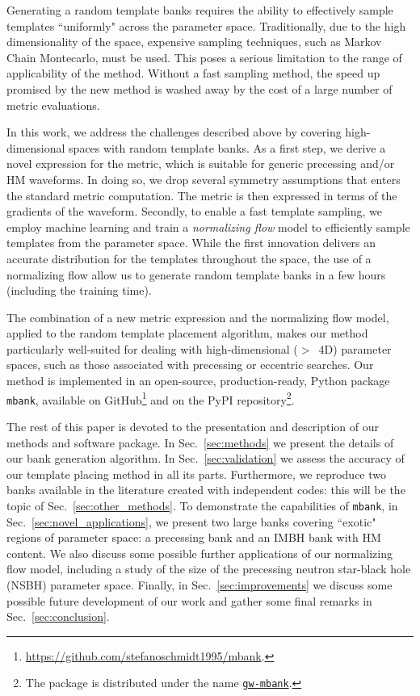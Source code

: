 \documentclass[twocolumn,showpacs,preprintnumbers,nofootinbib,prd,
superscriptaddress,10pt]{revtex4-2}
\begin{document}
Generating a random template banks requires the ability to effectively sample templates ``uniformly" across the parameter space. Traditionally, due to the high dimensionality of the space, expensive sampling techniques, such as Markov Chain Montecarlo, must be used. This poses a serious limitation to the range of applicability of the method. Without a fast sampling method, the speed up promised by the new method is washed away by the cost of a large number of metric evaluations.

In this work, we address the challenges described above by covering high-dimensional spaces with random template banks.
As a first step, we derive a novel expression for the metric, which is suitable for generic precessing and/or HM waveforms. In doing so, we drop several symmetry assumptions that enters the standard metric computation. The metric is then expressed in terms of the gradients of the waveform.
Secondly, to enable a fast template sampling, we employ machine learning and train a {\it normalizing flow} model to efficiently sample templates from the parameter space.
While the first innovation delivers an accurate distribution for the templates throughout the space, the use of a normalizing flow allow us to generate random template banks in a few hours (including the training time).

The combination of a new metric expression and the normalizing flow model, applied to the random template placement algorithm, makes our method particularly well-suited for dealing with high-dimensional ($>$~4D) parameter spaces, such as those associated with precessing or eccentric searches.
Our method is implemented in an open-source, production-ready, Python package \texttt{mbank}\cite{mbank}, available on GitHub\footnote{
\href{https://github.com/stefanoschmidt1995/mbank}{https://github.com/stefanoschmidt1995/mbank}.}
and on the PyPI repository\footnote{
The package is distributed under the name \texttt{\href{https://pypi.org/project/gw-mbank/}{gw-mbank}}.
}.

The rest of this paper is devoted to the presentation and description of our methods and software package.
In Sec.~\ref{sec:methods} we present the details of our bank generation algorithm.
In Sec.~\ref{sec:validation} we assess the accuracy of our template placing method in all its parts.
Furthermore, we reproduce two banks available in the literature \cite{Harry:2017weg, Sakon:2022ibh} created with independent codes: this will be the topic of Sec.~\ref{sec:other_methods}.
To demonstrate the capabilities of \texttt{mbank}, in Sec.~\ref{sec:novel_applications}, we present two large banks covering ``exotic" regions of parameter space: a precessing bank and an IMBH bank with HM content. We also discuss some possible further applications of our normalizing flow model, including a study of the size of the precessing neutron star-black hole (NSBH) parameter space.
Finally, in Sec.~\ref{sec:improvements} we discuss some possible future development of our work and gather some final remarks in Sec.~\ref{sec:conclusion}.
\end{document}
